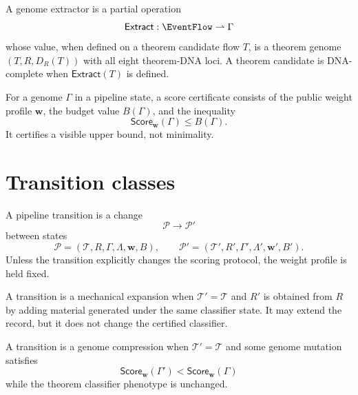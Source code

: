 \begin{definition}
\label{def:automated-discovery-genome-extractor}
A genome extractor is a partial operation
$$
\mathsf{Extract}:\EventFlow\rightharpoonup\Gamma
$$
whose value, when defined on a theorem candidate flow $T$, is a theorem genome
$(T,R,D_R(T))$ with all eight theorem-DNA loci. A theorem candidate is
DNA-complete when $\mathsf{Extract}(T)$ is defined.
\end{definition}

\begin{definition}
\label{def:automated-discovery-score-certificate}
For a genome $\Gamma$ in a pipeline state, a score certificate consists of the
public weight profile $\mathbf w$, the budget value $B(\Gamma)$, and the
inequality
$$
\mathsf{Score}_{\mathbf w}(\Gamma)\leq B(\Gamma).
$$
It certifies a visible upper bound, not minimality.
\end{definition}

\section{Transition classes}
\label{sec:automated-discovery-transition-classes}

\begin{definition}
\label{def:automated-discovery-pipeline-transition}
A pipeline transition is a change
$$
\mathcal P\longrightarrow\mathcal P'
$$
between states
$$
\mathcal P=(\mathcal T,R,\Gamma,\Lambda,\mathbf w,B),
\qquad
\mathcal P'=(\mathcal T',R',\Gamma',\Lambda',\mathbf w',B').
$$
Unless the transition explicitly changes the scoring protocol, the weight
profile is held fixed.
\end{definition}

\begin{definition}
\label{def:automated-discovery-mechanical-expansion}
A transition is a mechanical expansion when $\mathcal T'=\mathcal T$ and
$R'$ is obtained from $R$ by adding material generated under the same
classifier state. It may extend the record, but it does not change the
certified classifier.
\end{definition}

\begin{definition}
\label{def:automated-discovery-genome-compression}
A transition is a genome compression when $\mathcal T'=\mathcal T$ and some
genome mutation satisfies
$$
\mathsf{Score}_{\mathbf w}(\Gamma')<
\mathsf{Score}_{\mathbf w}(\Gamma)
$$
while the theorem classifier phenotype is unchanged.
\end{definition}

